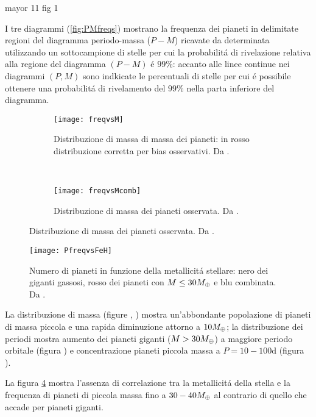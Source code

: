 \begin{workout}
mayor 11 fig 1
\end{workout}

I tre diagrammi (\ref{fig:PMfreqs}) mostrano la frequenza dei pianeti in delimitate regioni del diagramma periodo-massa ($P-M$)  ricavate da \cite{mayor2011harps} determinata utilizzando un sottocampione di stelle per cui la probabilit\'a di rivelazione relativa alla regione del diagramma $(P-M)$ \'e $99\%$: accanto alle linee continue nei diagrammi $(P,M)$ sono indkicate le percentuali di stelle per cui \'e possibile ottenere una probabilit\'a di rivelamento del $99\%$ nella parta inferiore del diagramma.

\begin{figure}[!ht]
\begin{subfigure}[b]{0.49\textwidth} \centering \texttt{[image: freqvsM]}
\caption{Distribuzione di massa di massa dei pianeti: in rosso distribuzione corretta per bias osservativi. Da \cite{mayor2011harps}.}\label{fig:freqvsM} \end{subfigure}
~
\begin{subfigure}[b]{0.49\textwidth} \centering \texttt{[image: freqvsMcomb]}
\caption{Distribuzione di massa dei pianeti osservata. Da \cite{mayor2011harps}.}\label{fig:freqvsMcomb}
\end{subfigure}
\end{figure}

\begin{figure}[!ht]
\centering \texttt{[image: PfreqvsFeH]}
\caption{Numero di pianeti in funzione della metallicit\'a stellare: nero dei giganti gassosi, rosso dei pianeti con $M\leq30M_{\oplus}{}$ e blu combinata. Da \cite{mayor2011harps}.}\label{fig:PfreqvsFeH}
\end{figure}

La distribuzione di massa (figure , ) mostra un'abbondante popolazione di pianeti di massa piccola e una rapida diminuzione attorno a $10M_{\oplus}{}$; la distribuzione dei periodi mostra aumento dei pianeti giganti ($M>30M_{\oplus}{}$) a maggiore periodo orbitale (figura ) e concentrazione pianeti piccola massa a $P=10-100\si{\day}$ (figura ).

La figura \ref{fig:PfreqvsFeH} mostra l'assenza di correlazione tra la metallicit\'a della stella e la frequenza di pianeti di piccola massa fino a $30-40M_{\oplus}{}$ al contrario di quello che accade per pianeti giganti.

